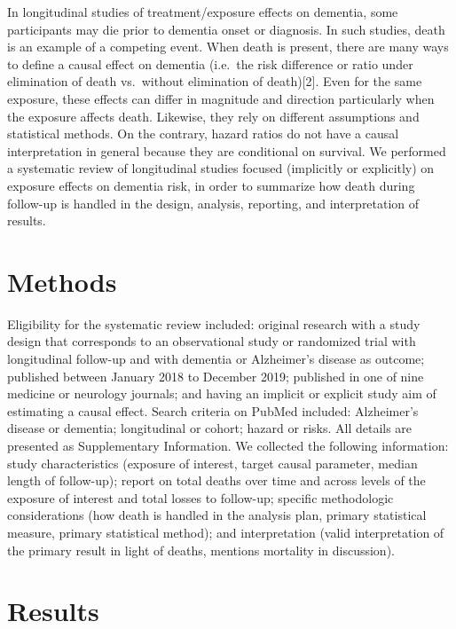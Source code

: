 \documentclass[
]{book}
\begin{document}
In longitudinal studies of treatment/exposure effects on dementia, some participants may die prior to dementia onset or diagnosis. In such studies, death is an example of a competing event\autocite{tsiatis1975,young2020}. When death is present, there are many ways to define a causal effect on dementia (i.e.~the risk difference or ratio under elimination of death vs.~without elimination of death){[}2{]}. Even for the same exposure, these effects can differ in magnitude and direction particularly when the exposure affects death. Likewise, they rely on different assumptions and statistical methods. On the contrary, hazard ratios do not have a causal interpretation in general because they are conditional on survival\autocite{young2020,hernan2010,stensrud2020,geskus2016}. We performed a systematic review of longitudinal studies focused (implicitly or explicitly) on exposure effects on dementia risk, in order to summarize how death during follow-up is handled in the design, analysis, reporting, and interpretation of results.

\hypertarget{methods-3}{%
\section{Methods}\label{methods-3}}

Eligibility for the systematic review included: original research with a study design that corresponds to an observational study or randomized trial with longitudinal follow-up and with dementia or Alzheimer's disease as outcome; published between January 2018 to December 2019; published in one of nine medicine or neurology journals; and having an implicit or explicit study aim of estimating a causal effect. Search criteria on PubMed included: Alzheimer's disease or dementia; longitudinal or cohort; hazard or risks. All details are presented as Supplementary Information. We collected the following information: study characteristics (exposure of interest, target causal parameter, median length of follow-up); report on total deaths over time and across levels of the exposure of interest and total losses to follow-up; specific methodologic considerations (how death is handled in the analysis plan, primary statistical measure, primary statistical method); and interpretation (valid interpretation of the primary result in light of deaths, mentions mortality in discussion).

\hypertarget{results-3}{%
\section{Results}\label{results-3}}
\end{document}
